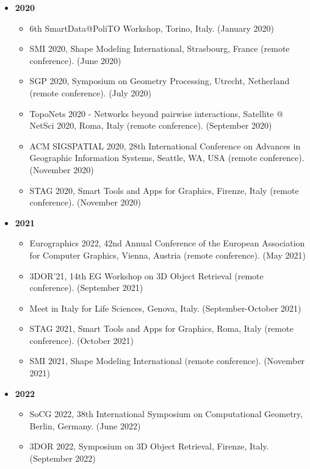 \documentclass[11pt]{article}
\begin{document}
\begin{itemize}
\begin{itemize}
\item{SoCG 2019, 35th International Symposium on Computational Geometry, Portland, OR, USA. (June 2019)}
\item{{\"O}MG Conference 2019, Dornbirn, Austria. (September 2019)}
\item{5th SmartData@PoliTO Workshop, Barolo, Italy. (September 2019)}
\item{Complex Simplex: Topological and Network Data Science Workshop, Torino, Italy. (October 2019)}
\end{itemize}
\vspace*{0.2ex}
\item[ ]{\bf 2020}
\begin{itemize}
\item{6th SmartData@PoliTO Workshop, Torino, Italy. (January 2020)}
\item{SMI 2020, Shape Modeling International, Strasbourg, France (remote conference). (June 2020)}
\item{SGP 2020, Symposium on Geometry Processing, Utrecht, Netherland (remote conference). (July 2020)}
\item{TopoNets 2020 - Networks beyond pairwise interactions, Satellite @ NetSci 2020, Roma, Italy (remote conference). (September 2020)}
\item{ACM SIGSPATIAL 2020, 28th International Conference on Advances in Geographic Information Systems, Seattle, WA, USA (remote conference). (November 2020)}
\item{STAG 2020, Smart Tools and Apps for Graphics, Firenze, Italy (remote conference). (November 2020)}
\end{itemize}
\vspace*{0.2ex}
\item[ ]{\bf 2021}
\begin{itemize}
\item{Eurographics 2022, 42nd Annual Conference of the European Association for Computer Graphics, Vienna, Austria (remote conference). (May 2021)}
\item{3DOR'21, 14th EG Workshop on 3D Object Retrieval (remote conference). (September 2021)}
\item{Meet in Italy for Life Sciences, Genova, Italy. (September-October 2021)}
\item{STAG 2021, Smart Tools and Apps for Graphics, Roma, Italy (remote conference). (October 2021)}
\item{SMI 2021, Shape Modeling International (remote conference). (November 2021)}
\end{itemize}
\item[ ]{\bf 2022}
\begin{itemize}
\item{SoCG 2022, 38th International Symposium on Computational Geometry, Berlin, Germany. (June 2022)}
\item {3DOR 2022, Symposium on 3D Object Retrieval, Firenze, Italy. (September 2022)}
\end{itemize}
\end{itemize}
\end{document}

